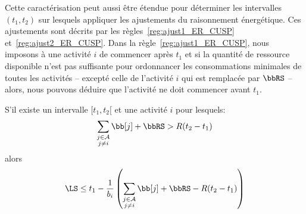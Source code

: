 Cette caractérisation peut aussi être étendue pour déterminer les
intervalles $(t_1,t_2)$ sur lesquels appliquer les ajustements du
raisonnement énergétique. Ces ajustements sont décrits par les 
règles~\ref{reg:ajust1_ER_CUSP} et~\ref{reg:ajust2_ER_CUSP}.  Dans la
règle~\ref{reg:ajust1_ER_CUSP}, nous imposons à une activité $i$ de
commencer après $t_1$ et si la quantité de ressource
disponible n'est pas suffisante pour ordonnancer les consommations
minimales de toutes les activités -- excepté celle de l'activité $i$
qui est remplacée par $\bbRS$ -- alors, nous pouvons déduire que
l'activité ne doit commencer avant $t_1$.

\begin{reg}
  \label{reg:ajust1_ER_CUSP}
  S'il existe un intervalle $[t_1,t_2[$ et une activité $i$ pour lesquels:
  \[ \sum_{\substack{j \in \A \\ j \neq i}} \bb[j] + \bbRS > R (t_2-t_1)\]
  alors 
  \[  \LS \le t_1 - \frac{1}{b_i} \left( \sum_{\substack{j \in \A \\ j
          \neq i}} \bb[j] + \bbRS - R (t_2-t_1) \right) \]
\end{reg}


